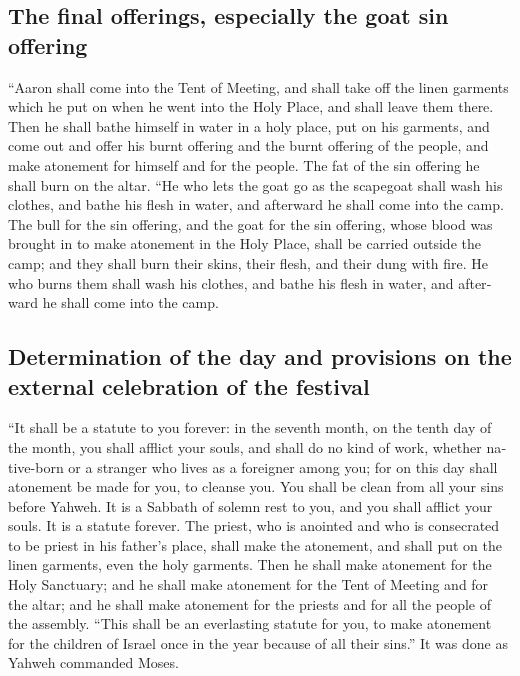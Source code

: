 \begin{paracol}{2}
\begin{otherlanguage}{english}
\hypertarget{the-final-offerings-especially-the-goat-sin-offering}{%
\subsection{The final offerings, especially the goat sin
offering}\label{the-final-offerings-especially-the-goat-sin-offering}}

 ``Aaron shall come into the Tent of Meeting, and shall
take off the linen garments which he put on when he went into the Holy
Place, and shall leave them there.  Then he shall bathe
himself in water in a holy place, put on his garments, and come out and
offer his burnt offering and the burnt offering of the people, and make
atonement for himself and for the people.  The fat of the
sin offering he shall burn on the altar.  ``He who lets
the goat go as the scapegoat shall wash his clothes, and bathe his flesh
in water, and afterward he shall come into the camp.  The
bull for the sin offering, and the goat for the sin offering, whose
blood was brought in to make atonement in the Holy Place, shall be
carried outside the camp; and they shall burn their skins, their flesh,
and their dung with fire.  He who burns them shall wash
his clothes, and bathe his flesh in water, and afterward he shall come
into the camp.

\hypertarget{determination-of-the-day-and-provisions-on-the-external-celebration-of-the-festival}{%
\subsection{Determination of the day and provisions on the external
celebration of the
festival}\label{determination-of-the-day-and-provisions-on-the-external-celebration-of-the-festival}}

 ``It shall be a statute to you forever: in the seventh
month, on the tenth day of the month, you shall afflict your souls, and
shall do no kind of work, whether native-born or a stranger who lives as
a foreigner among you;  for on this day shall atonement
be made for you, to cleanse you. You shall be clean from all your sins
before Yahweh.  It is a Sabbath of solemn rest to you,
and you shall afflict your souls. It is a statute forever.
 The priest, who is anointed and who is consecrated to be
priest in his father's place, shall make the atonement, and shall put on
the linen garments, even the holy garments.  Then he
shall make atonement for the Holy Sanctuary; and he shall make atonement
for the Tent of Meeting and for the altar; and he shall make atonement
for the priests and for all the people of the assembly. 
``This shall be an everlasting statute for you, to make atonement for
the children of Israel once in the year because of all their sins.'' It
was done as Yahweh commanded Moses.


\end{otherlanguage}
\end{paracol}
